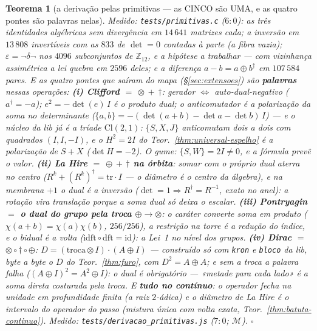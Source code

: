 \documentclass[11pt,a4paper]{article}
\newtheorem{teorema}{Teorema}
\newcommand{\code}[1]{\texttt{\small #1}}
\begin{document}
\begin{teorema}[a derivação pelas primitivas --- as CINCO são UMA, e as
quatro pontes são palavras nelas]
\emph{Medido:} \code{tests/primitivas.c} ($6{:}0$): as três identidades
algébricas sem divergência em $14\,641$ matrizes cada; a inversão em
$13\,808$ invertíveis com as $833$ de $\det=0$ contadas à parte (a fibra
vazia); $\varepsilon=\neg\delta\neg$ nos $4096$ subconjuntos de
$\mathbb{Z}_{12}$, e a hipótese a trabalhar --- com vizinhança
\emph{assimétrica} a lei quebra em $2596$ deles; e a diferença
$a-b=a\oplus b^{\dagger}$ em $107\,584$ pares. E as
quatro pontes que saíram do mapa (\S\ref{sec:extensoes}) são
\textbf{palavras} nessas operações:
\textbf{(i) Clifford $=$ $\otimes$ $+$ $\dagger$}: gerador $\iff$
auto-dual-negativo ($a^{\dagger}=-a$); $e^{2}=-\det(e)\,I$ é o produto
dual; o anticomutador é a \emph{polarização da soma no determinante}
($\{a,b\}=-(\det(a{+}b)-\det a-\det b)\,I$) --- e o núcleo da lib
\emph{já é} a tríade $\mathrm{Cl}(2,1)$: $\{S,X,J\}$ anticomutam dois
a dois com quadrados $(I,I,-I)$, e o $H^{2}=2I$ do
Teor.~\ref{thm:universal-espelho} é a polarização de $S{+}X$
($\det H=-2$). O gume: $\{S,W\}=2I\neq0$, e a fórmula \emph{prevê} o
valor.
\textbf{(ii) La Hire $=$ $\oplus$ $+$ $\dagger$ na órbita}: somar com
o próprio dual aterra no \emph{centro}
($R^{k}+(R^{k})^{\dagger}=\mathrm{tr}\cdot I$ --- o diâmetro é o
centro da álgebra), e na membrana $+1$ o dual é a inversão
($\det=1\Rightarrow R^{\dagger}=R^{-1}$, exato no anel): a rotação
vira translação porque a soma dual só deixa o escalar.
\textbf{(iii) Pontryagin $=$ o dual do grupo pela troca
$\oplus\to\otimes$}: o caráter converte soma em produto
($\chi(a{+}b)=\chi(a)\chi(b)$, $256/256$), a restrição na torre é a
redução do índice, e o \emph{bidual é a volta}
($\mathrm{idft}\circ\mathrm{dft}=\mathrm{id}$): a Lei~1 no nível dos
grupos.
\textbf{(iv) Dirac $=$ $\otimes\circ\dagger\circ\oplus$}:
$D=(\mathrm{troca}\otimes I)\cdot(A\oplus I)$ --- construído só com
\code{kron} e \code{bloco} da lib, byte a byte o $D$ do
Teor.~\ref{thm:furo}, com $D^{2}=A\oplus A$; e \emph{sem a troca a
palavra falha} ($(A\oplus I)^{2}=A^{2}\oplus I$): o dual é
obrigatório --- «metade para cada lado» é a soma direta costurada
pela troca. E \textbf{tudo no contínuo}: o operador fecha na unidade
em profundidade finita (a raiz $2$-ádica) e o diâmetro de La Hire é o
intervalo do operador do passo (mistura única com volta exata,
Teor.~\ref{thm:batuta-continuo}).
\emph{Medido:} \code{tests/derivacao\_primitivas.js} ($7{:}0$;
$\mathcal{M}$).
$\square$
\end{teorema}
\end{document}
